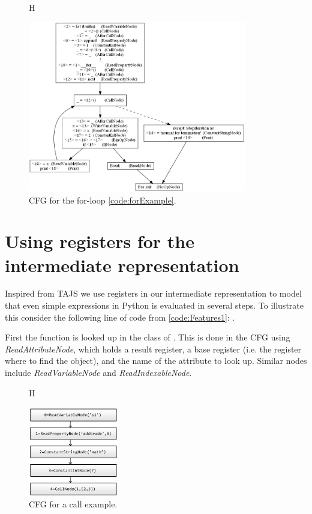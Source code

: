 \begin{figure}{H}
  \begin{center}
    \includegraphics[width=0.85\textwidth]{images/for-example-cfg2.png}
  \end{center}
  \caption{CFG for the for-loop \autoref{code:forExample}.}
  \label{fig:forCfg}
\end{figure}


\section{Using registers for the intermediate representation}
\label{CFG calls}
Inspired from TAJS \cite{tajs} we use registers in our intermediate representation to model that even simple expressions in Python is evaluated in several steps. To illustrate this consider the following line of code from \autoref{code:Features1}: .

First the function  is looked up in the class of . This is done in the CFG using \textit{ReadAttributeNode}, which holds a result register, a base register (i.e. the register where to find the object), and the name of the attribute to look up. Similar nodes include \textit{ReadVariableNode} and \textit{ReadIndexableNode}.

\begin{figure}{H}
	\begin{center}
		\includegraphics[width=0.35\textwidth]{images/Call-example.png}
	\end{center}
	\caption{CFG for a call example.}
	\label{fig:callCfg}
\end{figure}

